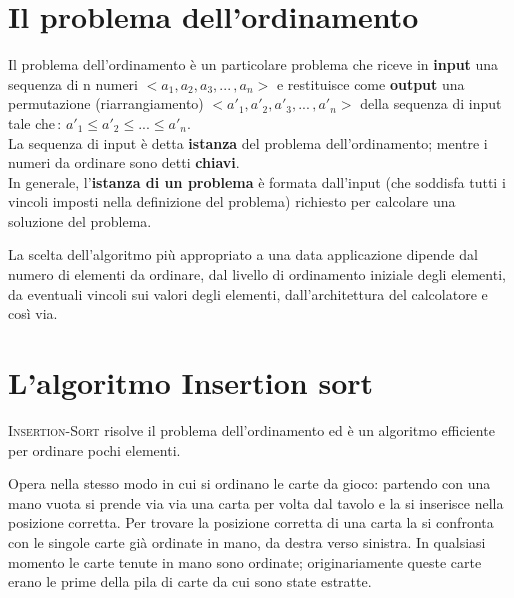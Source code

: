 \documentclass[10pt, a4paper]{report}
\begin{document}
\section{Il problema dell'ordinamento}
Il problema dell'ordinamento è un particolare problema che riceve in \textbf{input} una sequenza di n numeri $< a_1,a_2,a_3, ...\, , a_n >$ e restituisce come \textbf{output} una permutazione (riarrangiamento) $< a'_1,a'_2,a'_3, ...\, , a'_n >$ della sequenza di input tale che\,: $a'_1 \leq a'_2 \leq ... \leq a'_n$.\\La sequenza di input è detta \textbf{istanza} del problema dell'ordinamento; mentre i numeri da ordinare sono detti \textbf{chiavi}.\\In generale, l'\textbf{istanza di un problema} è formata dall'input (che soddisfa tutti i vincoli imposti nella definizione del problema) richiesto per calcolare una soluzione del problema.

La scelta dell'algoritmo più appropriato a una data applicazione dipende dal numero di elementi da ordinare, dal livello di ordinamento iniziale degli elementi, da eventuali vincoli sui valori degli elementi, dall'architettura del calcolatore e così via.
\section{L'algoritmo Insertion sort}
\textsc{Insertion-Sort} risolve il problema dell'ordinamento ed è un algoritmo efficiente per ordinare pochi elementi.

Opera nella stesso modo in cui si ordinano le carte da gioco: partendo con una mano vuota si prende via via una carta per volta dal tavolo e la si inserisce nella posizione corretta. Per trovare la posizione corretta di una carta la si confronta con le singole carte già ordinate in mano, da destra verso sinistra. In qualsiasi momento le carte tenute in mano sono ordinate; originariamente queste carte erano le prime della pila di carte da cui sono state estratte.
\end{document}
